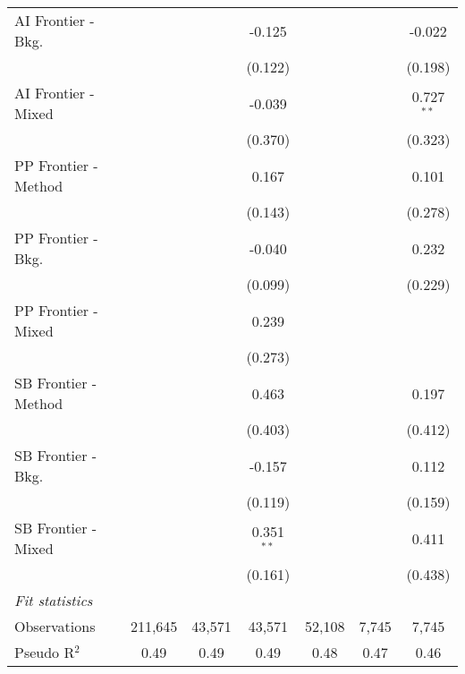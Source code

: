 \begin{tabular}{lcccccc}
   AI Frontier - Bkg.   &               &              & -0.125       &               &               & -0.022\\   
                        &               &              & (0.122)      &               &               & (0.198)\\   
   AI Frontier - Mixed  &               &              & -0.039       &               &               & 0.727$^{**}$\\   
                        &               &              & (0.370)      &               &               & (0.323)\\   
   PP Frontier - Method &               &              & 0.167        &               &               & 0.101\\   
                        &               &              & (0.143)      &               &               & (0.278)\\   
   PP Frontier - Bkg.   &               &              & -0.040       &               &               & 0.232\\   
                        &               &              & (0.099)      &               &               & (0.229)\\   
   PP Frontier - Mixed  &               &              & 0.239        &               &               &   \\   
                        &               &              & (0.273)      &               &               &   \\   
   SB Frontier - Method &               &              & 0.463        &               &               & 0.197\\   
                        &               &              & (0.403)      &               &               & (0.412)\\   
   SB Frontier - Bkg.   &               &              & -0.157       &               &               & 0.112\\   
                        &               &              & (0.119)      &               &               & (0.159)\\   
   SB Frontier - Mixed  &               &              & 0.351$^{**}$ &               &               & 0.411\\   
                        &               &              & (0.161)      &               &               & (0.438)\\   
   \midrule
   \emph{Fit statistics}\\
   Observations         & 211,645       & 43,571       & 43,571       & 52,108        & 7,745         & 7,745\\  
   Pseudo R$^2$         & 0.49          & 0.49         & 0.49         & 0.48          & 0.47          & 0.46\\  
   

\end{tabular}
